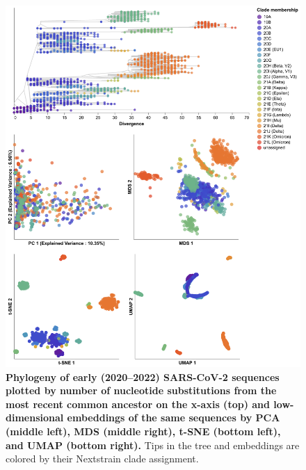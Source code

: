 \documentclass[10pt,letterpaper]{article}
\begin{document}
\begin{figure}[!h]
\includegraphics[width=\columnwidth]{figures/sarscov2-embeddings-by-Nextstrain_clade-clade.png}
\caption{{\bf Phylogeny of early (2020--2022) SARS-CoV-2 sequences plotted by number of nucleotide substitutions from the most recent common ancestor on the x-axis (top) and low-dimensional embeddings of the same sequences by PCA (middle left), MDS (middle right), t-SNE (bottom left), and UMAP (bottom right).}
  Tips in the tree and embeddings are colored by their Nextstrain clade assignment.
}
\label{fig:sars-cov-2-early-embeddings-by-Nextstrain-clade}
\end{figure}
\end{document}

